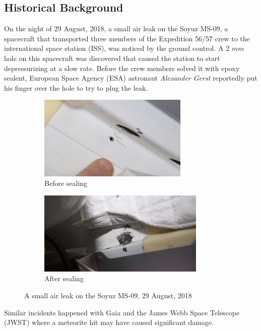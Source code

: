 \documentclass[a4paper, 14pt]{extarticle}
\begin{document}
\subsection{Historical Background}
On the night of 29 August, 2018, a small air leak on the Soyuz MS-09, a spacecraft that transported three members of the Expedition 56/57 crew to the international space station (ISS), was noticed by the ground control. A 2 $mm$ hole on this spacecraft was discovered that caused the station to start depressurizing at a slow rate. Before the crew members solved it with epoxy sealent, European Space Agency (ESA) astronaut \textit{Alexander Gerst} reportedly put his finger over the hole to try to plug the leak. \citep{guardian2018issleak} \citep{dailymail2018issleak}

\begin{figure}[ht]
  \begin{subfigure}{0.5\textwidth}
    \includegraphics[width=0.9\linewidth, height=4cm]{before_leak}
    \caption{Before sealing}
  \end{subfigure}
  \hfill
  \begin{subfigure}{0.55\textwidth}
    \includegraphics[width=0.85\linewidth, height=4cm]{after_leak}
    \caption{After sealing}
  \end{subfigure}
  \caption{A small air leak on the Soyuz MS-09, 29 August, 2018 \citep{nasaspaceflight2018issleak} }
\end{figure}

Similar incidents happened with Gaia \citep{esa2024} and the James Webb Space Telescope (JWST) \citep{jwst2022} where a meteorite hit may have caused significant damage.
\end{document}
